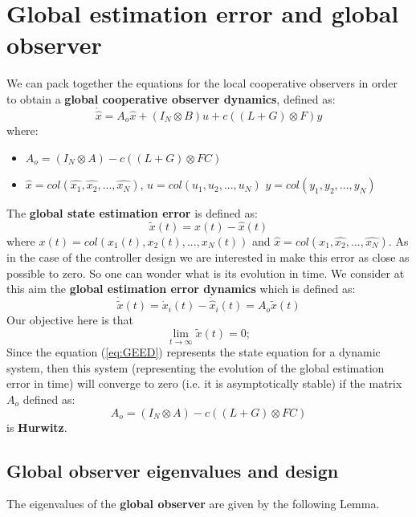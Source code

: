 \section{Global estimation error and global observer}
We can pack together the equations for the local cooperative observers in order to obtain a \textbf{global cooperative observer dynamics}, defined as:
\begin{equation}
    \dot{\hat{x}}= A_o\hat{x} + 
    (I_N \otimes B) u + c ((L+G)\otimes F) y
\end{equation}
where:
\begin{itemize}
    \item $A_o= (I_N \otimes A) - c ((L+G)\otimes FC)$
    \item $\hat{x} = col(\hat{x_1}, \hat{x_2}, ..., \hat{x_N})$, \quad $u=col(u_1, u_2, ..., u_N)$ \quad $y=col(y_1,y_2, ..., y_N)$
\end{itemize}
\noindent
The \textbf{global state estimation error} is defined as: 
\begin{equation}
    \tilde{x}(t) = x(t)-\hat{x}(t)
\end{equation}
where $x(t) = col(x_1(t), x_2(t), ..., x_N(t))$ and $\hat{x} = col(\hat{x_1}, \hat{x_2}, ..., \hat{x_N})$. 
As in the case of the controller design we are interested in make this error as close as possible to zero. So one can wonder what is its evolution in time. We consider at this aim the \textbf{global estimation error dynamics} which is defined as: 
\begin{equation}  \label{eq:GEED}
    \dot{\tilde{x}}(t) = \dot{x}_i(t) - \dot{\hat{x}}_i(t) = A_o \tilde{x}(t)
\end{equation}
Our objective here is that
\begin{equation}
    \lim_{t\to\infty} \tilde{x}(t) = 0; 
\end{equation}
Since the equation (\ref{eq:GEED}) represents the state equation for a dynamic system, then this system (representing the evolution of the global estimation error in time) will converge to zero (i.e. it is asymptotically stable) if the matrix $A_o$ defined as:
\begin{equation}
    A_o=(I_N \otimes A) - c ((L+G)\otimes FC)
\end{equation} 
is \textbf{Hurwitz}.

\subsection{Global observer eigenvalues and design}
The eigenvalues of the \textbf{global observer} are given by the following Lemma. 

